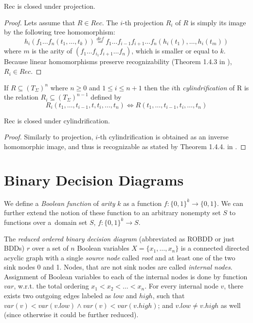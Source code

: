 \begin{lemma}
Rec is closed under projection.
\end{lemma}

\begin{proof}
 Lets assume that $R \in Rec$. The $i$-th projection $R_i$ of $R$ is simply its image by the following tree homomorphism: 
 \begin{equation}
 h_i(f_1\ldots f_n (t_1,\ldots,t_k)) \overset{def}{=} f_1\ldots f_{i-1}f_{i+1}\ldots f_n(h_i(t_1),\ldots,h_i(t_m))
\end{equation}
where $m$ is the arity of $(f_1\ldots f_{i_1}f_{i+1}\ldots f_n)$, which is smaller or equal to $k$. Because linear homomorphisms preserve recognizability (Theorem 1.4.3 in \cite{tata}), $R_i \in Rec$.
\end{proof}

\begin{defz}
 If $R \subseteq (T_\Sigma)^n$ where $n \geq 0$ and $1 \leq i \leq n+1$ then the $i$th \emph{cylindrification} of R is the relation $R_i \subseteq (T_\Sigma)^{n-1}$ defined by $$ R_i(t_1,\ldots,t_{i-1},t,t_i,\ldots,t_n) \Leftrightarrow R(t_1,\ldots,t_{i-1},t_i,\ldots,t_n)$$
\end{defz}

\begin{lemma}
Rec is closed under cylindrification.
\end{lemma}

\begin{proof}
 Similarly to projection, $i$-th cylindrification is obtained as an inverse homomorphic image, and thus is recognizable as stated by Theorem 1.4.4. in \cite{tata}.
\end{proof}

 \section{Binary Decision Diagrams}\label{bdd}

We define a \emph{Boolean function} of \emph{arity} $k$ as a function $f : \{0,1\}^k \longrightarrow \{0,1\}$. We can further extend the notion of these function to an arbitrary nonempty set $S$ to functions over a~domain set $S$, $f : \{0,1\}^k \longrightarrow S$.

The \emph{reduced ordered binary decision diagram} (abbreviated as ROBDD or just BDDs) $r$ over a set of $n$ Boolean variables $X = \{x_1,\ldots,x_n\}$ is a connected directed acyclic graph with a single \emph{source node} called \emph{root} and at least one of the two sink nodes 0 and 1. Nodes, that are not sink nodes are called \emph{internal nodes}. Assignment of Boolean variables to each of the internal nodes is done by function $var$, w.r.t. the total ordering $x_1 < x_2 < \ldots < x_n$. For every internal node $v$, there exists two outgoing edges labeled as $low$ and $high$, such that $var(v) < var(v.low) \wedge var(v) < var(v.high)$; and $v.low \neq v.high$ as well (since otherwise it could be further reduced).

